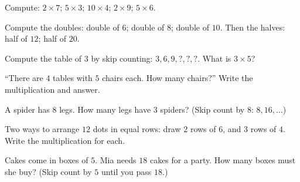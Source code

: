 \begin{exercise}[$\star$]\label{exo:g2:mult:4}
Compute: $2 \times 7$; \quad $5 \times 3$; \quad $10 \times 4$;
\quad $2 \times 9$; \quad $5 \times 6$.
\end{exercise}

\begin{exercise}[$\star$]\label{exo:g2:mult:5}
Compute the doubles: double of $6$; double of $8$; double of $10$.
Then the halves: half of $12$; half of $20$.
\end{exercise}

\begin{exercise}[$\star$]\label{exo:g2:mult:6}
Compute the table of $3$ by skip counting: $3, 6, 9, ?, ?, ?$. What
is $3 \times 5$?
\end{exercise}

\begin{exercise}[$\star$]\label{exo:g2:mult:7}
``There are $4$ tables with $5$ chairs each. How many chairs?''
Write the multiplication and answer.
\end{exercise}

\begin{exercise}[$\star$]\label{exo:g2:mult:8}
A spider has $8$ legs. How many legs have $3$ spiders? (Skip count
by $8$: $8, 16, \dots$)
\end{exercise}

\begin{exercise}[$\star$]\label{exo:g2:mult:9}
Two ways to arrange $12$ dots in equal rows: draw $2$ rows of $6$,
and $3$ rows of $4$. Write the multiplication for each.
\end{exercise}

\begin{exercise}[$\star\star$]\label{exo:g2:mult:10}
Cakes come in boxes of $5$. Mia needs $18$ cakes for a party. How
many boxes must she buy? (Skip count by $5$ until you pass $18$.)
\end{exercise}
